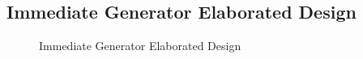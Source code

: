 \documentclass[
    a4paper, %
	12pt, %
    ]{CSSullivanBusinessReport}
\begin{document}
\begin{fullwidth}
\subsection{Immediate Generator Elaborated Design} %
\begin{figure}[H]
    \centering
    \captionsetup{style=widetable}
    \caption{Immediate Generator Elaborated Design}
    \label{fig:ALUElaboratedDesign}
\end{figure}


\end{fullwidth}
\end{document}

